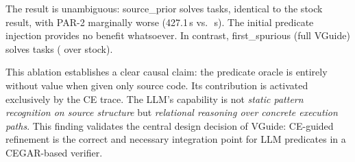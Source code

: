 The result is unambiguous: source\_prior solves \AblationSourcePrior{} tasks, identical
to the stock result, with PAR-2 marginally worse (427.1\,s vs.\ \LoopsPARStock{}\,s).
The initial predicate injection provides no benefit whatsoever. In contrast,
first\_spurious (full VGuide) solves \AblationFirstSpurious{} tasks (\LoopsDelta{}
over stock).

This ablation establishes a clear causal claim: the \LLMName{} predicate oracle is
entirely without value when given only source code. Its contribution is activated
exclusively by the CE trace. The LLM's capability is not \emph{static pattern recognition
on source structure} but \emph{relational reasoning over concrete execution paths}. This
finding validates the central design decision of VGuide: CE-guided refinement is the
correct and necessary integration point for LLM predicates in a CEGAR-based verifier.
